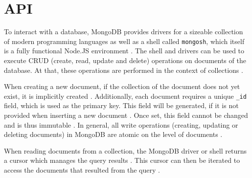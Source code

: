 
\section{API}
To interact with a database, MongoDB provides drivers for a sizeable collection of modern programming languages as well as a shell called \texttt{mongosh}, which itself is a fully
functional Node.JS environment \parencite{Mongo-mongosh, Mongo-API}. The shell and drivers can be used to execute CRUD (create, read, update and delete) operations on documents of the database.
At that, these operations are performed in the context of collections \parencites{Mongo-Crud}[pp. 347-349]{Truica2013}. 

When creating a new document, if the collection of the document does not yet exist, it is implicitly created \parencite{Mongo-insert}. Additionally, each document requires a unique \texttt{\_id} 
field, which is used as the primary key. This field will be generated, if it is not provided when inserting a new document \parencite{Mongo-insert}. Once set, this field cannot be changed and 
is thus immutable \parencite{Mongo-update}. In general, all write operations (creating, updating or deleting documents) in MongoDB are atomic on the level of documents \parencite{Mongo-insert, Mongo-update, Mongo-delete}.

When reading documents from a collection, the MongoDB driver or shell returns a cursor which manages the query results \parencite{Mongo-read}. This cursor can then be iterated to access the 
documents that resulted from the query \parencite{Mongo-cursor}.



